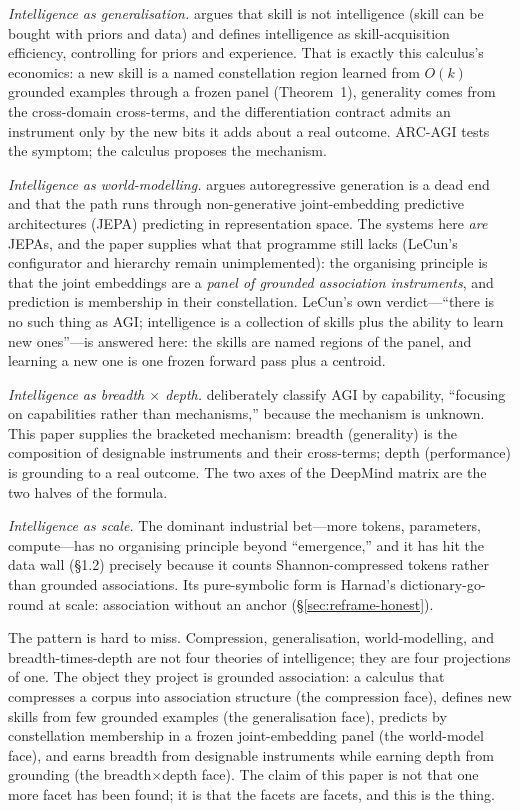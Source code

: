\documentclass[10pt,twocolumn]{article}
\begin{document}
\emph{Intelligence as generalisation.} \citet{chollet2019measure} argues that
skill is not intelligence (skill can be bought with priors and data) and defines
intelligence as skill-acquisition efficiency, controlling for priors and
experience. That is exactly this calculus's economics: a new skill is a named
constellation region learned from $O(k)$ grounded examples through a frozen panel
(Theorem~1), generality comes from the cross-domain cross-terms, and the
differentiation contract admits an instrument only by the new bits it adds about a
real outcome. ARC-AGI tests the symptom; the calculus proposes the mechanism.

\emph{Intelligence as world-modelling.} \citet{lecun2022path} argues
autoregressive generation is a dead end and that the path runs through
non-generative joint-embedding predictive architectures (JEPA) predicting in
representation space. The systems here \emph{are} JEPAs, and the paper supplies
what that programme still lacks (LeCun's configurator and hierarchy remain
unimplemented): the organising principle is that the joint embeddings are a
\emph{panel of grounded association instruments}, and prediction is membership in
their constellation. LeCun's own verdict---``there is no such thing as AGI;
intelligence is a collection of skills plus the ability to learn new ones''---is
answered here: the skills are named regions of the panel, and learning a new one
is one frozen forward pass plus a centroid.

\emph{Intelligence as breadth $\times$ depth.} \citet{morris2024levels}
deliberately classify AGI by capability, ``focusing on capabilities rather than
mechanisms,'' because the mechanism is unknown. This paper supplies the bracketed
mechanism: breadth (generality) is the composition of designable instruments and
their cross-terms; depth (performance) is grounding to a real outcome. The two
axes of the DeepMind matrix are the two halves of the formula.

\emph{Intelligence as scale.} The dominant industrial bet---more tokens,
parameters, compute---has no organising principle beyond ``emergence,'' and it has
hit the data wall (\S1.2) precisely because it counts Shannon-compressed tokens
rather than grounded associations. Its pure-symbolic form is Harnad's
dictionary-go-round at scale: association without an anchor
(\S\ref{sec:reframe-honest}).

The pattern is hard to miss. Compression, generalisation, world-modelling, and
breadth-times-depth are not four theories of intelligence; they are four
projections of one. The object they project is grounded association: a calculus
that compresses a corpus into association structure (the compression face),
defines new skills from few grounded examples (the generalisation face), predicts
by constellation membership in a frozen joint-embedding panel (the world-model
face), and earns breadth from designable instruments while earning depth from
grounding (the breadth$\times$depth face). The claim of this paper is not that one
more facet has been found; it is that the facets are facets, and this is the thing.
\end{document}
